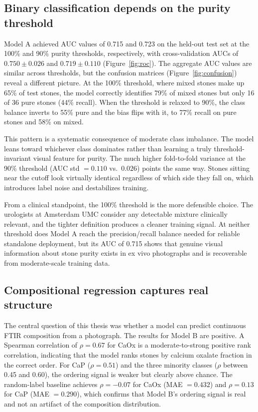 \documentclass[10pt,twocolumn]{article}
\begin{document}
\subsection*{Binary classification depends on the purity threshold}

Model A achieved AUC values of 0.715 and 0.723 on the held-out test set at the 100\% and 90\% purity thresholds, respectively, with cross-validation AUCs of $0.750 \pm 0.026$ and $0.719 \pm 0.110$ (Figure~\ref{fig:roc}). The aggregate AUC values are similar across thresholds, but the confusion matrices (Figure~\ref{fig:confusion}) reveal a different picture. At the 100\% threshold, where mixed stones make up 65\% of test stones, the model correctly identifies 79\% of mixed stones but only 16 of 36 pure stones (44\% recall). When the threshold is relaxed to 90\%, the class balance inverts to 55\% pure and the bias flips with it, to 77\% recall on pure stones and 58\% on mixed.

This pattern is a systematic consequence of moderate class imbalance. The model leans toward whichever class dominates rather than learning a truly threshold-invariant visual feature for purity. The much higher fold-to-fold variance at the 90\% threshold (AUC std $= 0.110$ vs.\ $0.026$) points the same way. Stones sitting near the cutoff look virtually identical regardless of which side they fall on, which introduces label noise and destabilizes training.

From a clinical standpoint, the 100\% threshold is the more defensible choice. The urologists at Amsterdam UMC consider any detectable mixture clinically relevant, and the tighter definition produces a cleaner training signal. At neither threshold does Model A reach the precision/recall balance needed for reliable standalone deployment, but its AUC of 0.715 shows that genuine visual information about stone purity exists in ex vivo photographs and is recoverable from moderate-scale training data.

\subsection*{Compositional regression captures real structure}

The central question of this thesis was whether a model can predict continuous FTIR composition from a photograph. The results for Model B are positive. A Spearman correlation of $\rho = 0.67$ for CaOx is a moderate-to-strong positive rank correlation, indicating that the model ranks stones by calcium oxalate fraction in the correct order. For CaP ($\rho = 0.51$) and the three minority classes ($\rho$ between 0.45 and 0.60), the ordering signal is weaker but clearly above chance. The random-label baseline achieves $\rho = -0.07$ for CaOx (MAE $= 0.432$) and $\rho = 0.13$ for CaP (MAE $= 0.290$), which confirms that Model B's ordering signal is real and not an artifact of the composition distribution.
\end{document}
